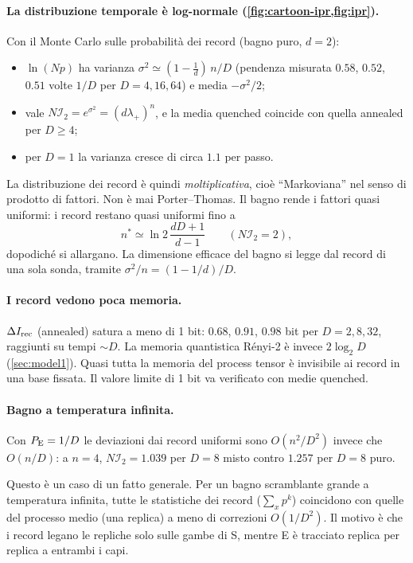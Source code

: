 \paragraph{La distribuzione temporale è log-normale (\cref{fig:cartoon-ipr,fig:ipr}).} Con il Monte Carlo sulle probabilità dei record (bagno puro, $d=2$):
\begin{itemize}[leftmargin=1.5em]
\item $\ln(Np)$ ha varianza $\sigma^2\simeq(1-\tfrac1d)\,n/D$ (pendenza misurata $0.58$, $0.52$, $0.51$ volte $1/D$ per $D=4,16,64$) e media $-\sigma^2/2$;
\item vale $N\mathcal I_2=e^{\sigma^2}=(d\lambda_+)^n$, e la media quenched coincide con quella annealed per $D\ge4$;
\item per $D=1$ la varianza cresce di circa $1.1$ per passo.
\end{itemize}
La distribuzione dei record è quindi \emph{moltiplicativa}, cioè ``Markoviana'' nel senso di prodotto di fattori. Non è mai Porter--Thomas. Il bagno rende i fattori quasi uniformi: i record restano quasi uniformi fino a
\[
n^*\simeq\ln2\,\frac{dD+1}{d-1}\qquad(N\mathcal I_2=2),
\]
dopodiché si allargano. La dimensione efficace del bagno si legge dal record di una sola sonda, tramite $\sigma^2/n=(1-1/d)/D$.

\paragraph{I record vedono poca memoria.} $\Delta I_{\rm rec}$ (annealed) satura a meno di 1 bit: $0.68$, $0.91$, $0.98$ bit per $D=2,8,32$, raggiunti su tempi $\sim D$. La memoria quantistica Rényi-2 è invece $2\log_2D$ (\cref{sec:model1}). Quasi tutta la memoria del process tensor è invisibile ai record in una base fissata. Il valore limite di 1 bit va verificato con medie quenched.

\paragraph{Bagno a temperatura infinita.} Con $P_{\rm E}=1/D$ le deviazioni dai record uniformi sono $O(n^2/D^2)$ invece che $O(n/D)$: a $n=4$, $N\mathcal I_2=1.039$ per $D=8$ misto contro $1.257$ per $D=8$ puro.

Questo è un caso di un fatto generale. Per un bagno scramblante grande a temperatura infinita, tutte le statistiche dei record ($\sum_xp^k$) coincidono con quelle del processo medio (una replica) a meno di correzioni $O(1/D^2)$. Il motivo è che i record legano le repliche solo sulle gambe di S, mentre E è tracciato replica per replica a entrambi i capi.

